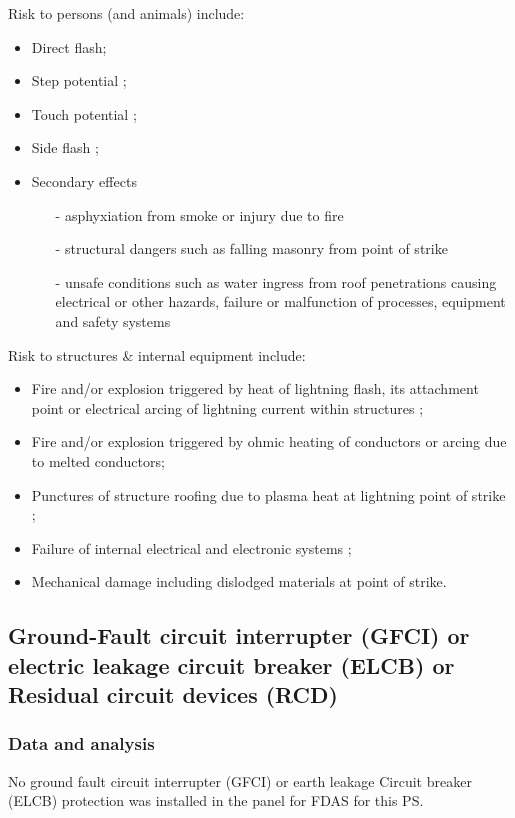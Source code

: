 Risk to persons (and animals) include: 

\begin{itemize}
\item Direct flash;
\item  Step potential ;
\item Touch potential ;
\item  Side flash ;
\item Secondary effects

\begin{itemize}
	
	 \item[-]  asphyxiation from smoke or injury due to fire 
	\item [-] structural dangers such as falling masonry from  point of strike 
	\item [-] unsafe conditions such as water ingress from roof  penetrations causing electrical or other hazards,  failure or malfunction of processes, equipment and  safety systems

\end{itemize}
\end{itemize}




Risk to structures \& internal equipment include: 

\begin{itemize}
\item Fire and/or explosion triggered by heat of lightning flash,  its attachment point or electrical arcing of lightning  current within structures ;
\item  Fire and/or explosion triggered by ohmic heating of  conductors or arcing due to melted conductors;
\item Punctures of structure roofing due to plasma heat  at lightning point of strike ;
\item Failure of internal electrical and electronic systems ;
\item Mechanical damage including dislodged materials at  point of strike.
\end{itemize}


\subsection{Ground-Fault circuit interrupter (GFCI) or electric leakage circuit breaker (ELCB) or Residual circuit devices (RCD)} \label{ch04fdas03}
\subsubsection{Data and analysis}
No ground fault circuit interrupter (GFCI) or earth leakage Circuit breaker (ELCB) protection was installed in the panel for FDAS for this PS.


